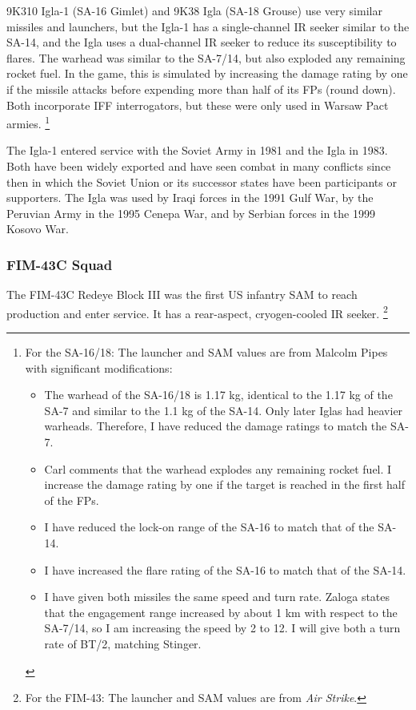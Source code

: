 \documentclass[10pt]{article}
\newcommand{\note}[1]{%
    \footnote{%
        \setlength{\parindent}{0pt}%
        \setlength{\parskip}{\smallskipamount}%
        #1
    }%
}
\begin{document}
9K310 Igla-1 (SA-16 Gimlet) and 9K38 Igla (SA-18 Grouse) use very similar missiles and launchers, but the Igla-1 has a single-channel IR seeker similar to the SA-14, and the Igla uses a dual-channel IR seeker to reduce its susceptibility to flares.
The warhead was similar to the SA-7/14, but also exploded any remaining rocket fuel.
In the game, this is simulated by increasing the damage rating by one if the missile attacks before expending more than half of its FPs (round down).
Both incorporate IFF interrogators, but these were only used in Warsaw Pact armies.%
\note{
    For the SA-16/18:  The launcher and SAM values are from Malcolm Pipes with significant modifications:
    \begin{itemize}
        \item The warhead of the SA-16/18 is 1.17 kg, identical to the 1.17 kg of the SA-7 and similar to the 1.1 kg of the SA-14. Only later Iglas had heavier warheads. Therefore, I have reduced the damage ratings to match the SA-7.
        \item Carl comments that the warhead explodes any remaining rocket fuel. I increase the damage rating by one if the target is reached in the first half of the FPs.
        \item I have reduced the lock-on range of the SA-16 to match that of the SA-14.
        \item I have increased the flare rating of the SA-16 to match that of the SA-14.
        \item I have given both missiles the same speed and turn rate. Zaloga states that the engagement range increased by about 1 km with respect to the SA-7/14, so I am increasing the speed by 2 to 12. I will give both a turn rate of BT/2, matching Stinger.
    \end{itemize}
}

The Igla-1 entered service with the Soviet Army in 1981 and the Igla in 1983.
Both have been widely exported and have seen combat in many conflicts since then in which the Soviet Union or its successor states have been participants or supporters.
The Igla was used by Iraqi forces in the 1991 Gulf War, by the Peruvian Army in the 1995 Cenepa War, and by Serbian forces in the 1999 Kosovo War.

\subsubsection{FIM-43C Squad}

The FIM-43C Redeye Block III was the first US infantry SAM to reach production and enter service.
It has a rear-aspect, cryogen-cooled IR seeker.%
\note{
    For the FIM-43: The launcher and SAM values are from \emph{Air Strike}.
}
\end{document}

